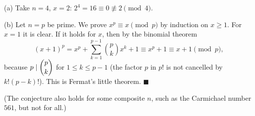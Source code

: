 (a) Take $n=4$, $x=2$: $2^4=16\equiv0\not\equiv2\pmod4$.

(b) Let $n=p$ be prime. We prove $x^p\equiv x\pmod p$ by induction on $x\ge1$. For $x=1$ it is clear. If it holds for $x$, then by the binomial theorem
\[(x+1)^p=x^p+\sum_{k=1}^{p-1}\binom pkx^k+1\equiv x^p+1\equiv x+1\pmod p,\]
because $p\mid\dbinom pk$ for $1\le k\le p-1$ (the factor $p$ in $p!$ is not cancelled by $k!(p-k)!$). This is Fermat's little theorem. $\blacksquare$

(The conjecture also holds for some composite $n$, such as the Carmichael number $561$, but not for all.)
